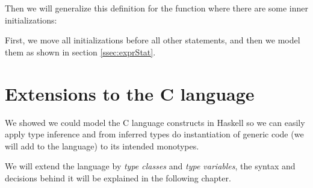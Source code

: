 Then we will generalize this definition for the function where there are some inner initializations:

First, we move all initializations before all other statements, and then we model them as shown in section \ref{ssec:exprStat}.

\section{Extensions to the C language}

We showed we could model the C language constructs in Haskell so we can easily apply type inference and from inferred types do instantiation of generic code (we will add to the language) to its intended monotypes.

We will extend the language by \emph{type classes} and \emph{type variables}, the syntax and decisions behind it will be explained in the following chapter.
